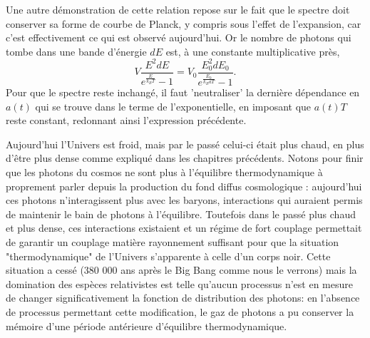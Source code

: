 Une autre démonstration de cette relation repose sur le fait que le spectre doit conserver sa forme de courbe de Planck, y compris sous l'effet de l'expansion, car c'est effectivement ce qui est observé aujourd'hui. Or le nombre de photons qui tombe dans une bande d'énergie $dE$ est, à une constante multiplicative près,
\begin{equation}
V \frac{E^2 dE}{e^{\frac{E}{k_B T}}-1}=V_0 \frac{E_0^2 dE_0}{e^{\frac{E_0}{k_B aT}}-1}.
\end{equation}
Pour que le spectre reste inchangé, il faut 'neutraliser' la dernière dépendance en $a(t)$ qui se trouve dans le terme de l'exponentielle, en imposant que $a(t) T$ reste constant, redonnant ainsi l'expression précédente.


Aujourd'hui l'Univers est froid, mais par le passé celui-ci était plus chaud, en plus d'être plus dense comme expliqué dans les chapitres précédents. Notons pour finir que les photons du cosmos ne sont plus à l'équilibre thermodynamique à proprement parler depuis la production du fond diffus cosmologique : aujourd'hui ces photons n'interagissent plus avec les baryons, interactions qui auraient permis de maintenir le bain de photons à l'équilibre. Toutefois dans le passé plus chaud et plus dense, ces interactions existaient et un régime de fort couplage permettait de garantir un couplage matière rayonnement suffisant pour que la situation "thermodynamique" de l'Univers s'apparente à celle d'un corps noir. Cette situation a cessé (380 000 ans après le Big Bang comme nous le verrons) mais la domination des espèces relativistes est telle qu'aucun processus n'est en mesure de changer significativement la fonction de distribution des photons: en l'absence de processus permettant cette modification, le gaz de photons a pu conserver la mémoire d'une période antérieure d'équilibre thermodynamique.

